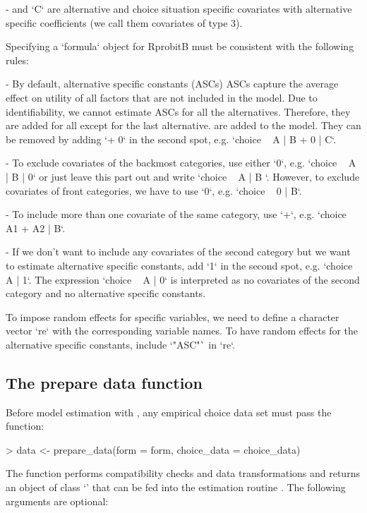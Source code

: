 \documentclass[article]{jss}
\newcommand{\class}[1]{`\code{#1}'}
\newcommand{\fct}[1]{\code{#1()}}
\begin{document}
- and `C` are alternative and choice situation specific covariates with
alternative specific coefficients (we call them covariates of type 3).

Specifying a `formula` object for {RprobitB} must be consistent with the following rules:

- By default, alternative specific constants (ASCs) ASCs capture the average effect on utility of all factors that are not included in the model. Due to identifiability, we cannot estimate ASCs for all the alternatives. Therefore, they are added for all except for the last alternative. are added to the model. They can be removed by adding `+ 0` in the second spot, e.g. `choice ~ A | B + 0 | C`.

- To exclude covariates of the backmost categories, use either `0`, e.g. `choice ~ A | B | 0` or just leave this part out and write `choice ~ A | B `. However, to exclude covariates of front categories, we have to use `0`, e.g. `choice ~ 0 | B`.

- To include more than one covariate of the same category, use `+`, e.g. `choice ~ A1 + A2 | B`.

- If we don't want to include any covariates of the second category but we want to estimate alternative specific constants, add `1` in the second spot, e.g. `choice ~ A | 1`. The expression `choice ~ A | 0` is interpreted as no covariates of the second category and no alternative specific constants.

To impose random effects for specific variables, we need to define a character vector `re` with the corresponding variable names. To have random effects for the alternative specific constants, include `"ASC"` in `re`.

\subsection{The prepare data function} \label{subsec:prepare_data}

Before model estimation with , any empirical choice data set  must pass the \fct{prepare\_data} function:

\begin{Schunk}
\begin{Sinput}
> data <- prepare_data(form = form, choice_data = choice_data)
\end{Sinput}
\end{Schunk}

The function performs compatibility checks and data transformations and returns an object of class \class{RprobitB\_data} that can be fed into the estimation routine \fct{mcmc}. The following arguments are optional:
\end{document}

